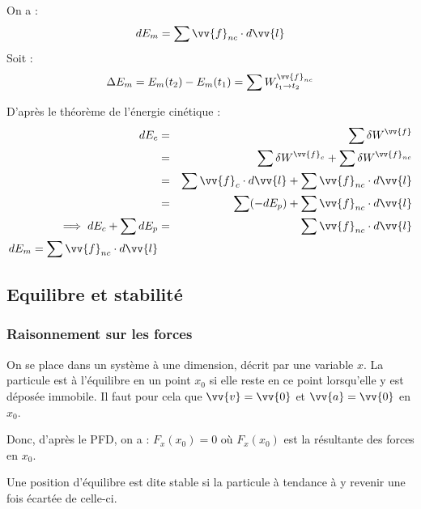 \begin{theorem}
    On a : 
    \[
        dE_{m} = \sum \vv{f}_{nc} \cdot d\vv{l}
    \]
    Soit : 
    \[
        \Delta E_{m} = E_{m}(t_{2}) - E_{m}(t_{1}) = \sum W^{\vv{f}_{nc}}_{t_{1} \to t_{2}}
    \]
    \begin{explanation}
        D'après le théorème de l'énergie cinétique : 
        \begin{eqnarray*}
            dE_{c} &=& \sum \delta W^{\vv{f}} \\
            &=& \sum \delta W^{\vv{f}_{c}} + \sum \delta W^{\vv{f}_{nc}} \\
            &=& \sum \vv{f}_{c} \cdot d\vv{l} + \sum \vv{f}_{nc} \cdot d\vv{l} \\
            &=& \sum (-dE_{p}) + \sum \vv{f}_{nc} \cdot d\vv{l} \\
            \implies dE_{c} + \sum dE_{p} &=& \sum \vv{f}_{nc} \cdot d\vv{l} \\
            dE_{m} = \sum \vv{f}_{nc} \cdot d\vv{l}
        \end{eqnarray*}
    \end{explanation}
\end{theorem}

\subsection{Equilibre et stabilité}
\subsubsection{Raisonnement sur les forces}

\begin{definition}
    On se place dans un système à une dimension, décrit par une variable \(x\). La particule est à l'équilibre en un point \(x_{\text{0}}\) si elle reste en ce point lorsqu'elle y est déposée immobile. Il faut pour cela que \(\vv{v} = \vv{0}\) et \(\vv{a} = \vv{0}\) en \(x_{\text{0}}\).
\end{definition}

\begin{corollary}
    Donc, d'après le PFD, on a : \(F_{x}(x_{\text{0}}) = 0\) où \(F_{x}(x_{0})\) est la résultante des forces en \(x_{\text{0}}\). 
\end{corollary}

\begin{definition}
    Une position d'équilibre est dite stable si la particule à tendance à y revenir une fois écartée de celle-ci. 
\end{definition}

